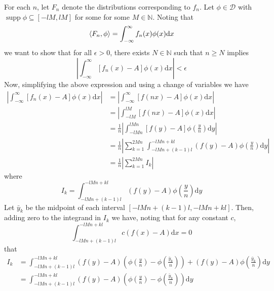 \documentclass{article}
\DeclareMathOperator\supp{supp}
\begin{document}
For each $n$, let $F_n$ denote the distributions corresponding to $f_n$.
Let $\phi \in \mathcal{D}$ with $\supp \phi \subseteq [-l M, l M]$ for
some for some $M \in \mathbb{N}$. Noting that
%
\begin{equation*}
    \langle F_n, \phi \rangle
        = \int_{-\infty}^{\infty} f_n(x) \phi(x) \mathrm{d} x \\
\end{equation*}
%
we want to show that for all $\epsilon > 0$, there exists
$N \in \mathbb{N}$ such that $n \geq N$ implies
%
\begin{equation*}
    \left| \int_{-\infty}^{\infty} \left[ f_n(x) - A \right] \phi(x) \mathrm{d} x \right| < \epsilon
\end{equation*}
%
Now, simplifying the above expression and using a change of variables we have
%
\begin{align*}
    \left| \int_{-\infty}^{\infty} \left[ f_n(x) - A \right] \phi(x) \mathrm{d} x \right|
        &=\left| \int_{-\infty}^{\infty} \left[ f(n x) - A \right] \phi(x) \mathrm{d} x \right| \\
        &= \left| \int_{-l M}^{l M} \left[ f(n x) - A \right] \phi(x) \mathrm{d} x \right| \\
        &= \frac{1}{n} \left| \int_{-l M n}^{l M n} \left[ f(y) - A \right] \phi\left(\frac{y}{n}\right) \mathrm{d} y \right| \\
        &= \frac{1}{n} \left| \sum_{k = 1}^{2 M n} \int_{-l M n + (k - 1) l}^{- l M n + k l} \left( f(y) - A \right) \phi\left(\frac{y}{n}\right) \mathrm{d} y \right| \\
        &= \frac{1}{n} \left| \sum_{k = 1}^{2 M n} I_k \right|
\end{align*}
%
where
%
\begin{equation*}
    I_k = \int_{-l M n + (k - 1) l}^{- l M n + k l} \left( f(y) - A \right) \phi\left(\frac{y}{n}\right) \mathrm{d} y
\end{equation*}
%
Let $\bar{y}_k$ be the midpoint of each interval
$[- l M n + (k - 1) l, - l M n + k l]$. Then, adding zero to the
integrand in $I_k$ we have, noting that for any constant $c$,
%
\begin{equation*}
    \int_{-l M n + (k - 1) l}^{- l M n + k l} c \left( f(x) - A \right) \mathrm{d} x = 0
\end{equation*}
%
that
%
\begin{align*}
    I_k &= \int_{-l M n + (k - 1) l}^{- l M n + k l}
            \left( f(y) - A \right) \left( \phi\left(\frac{y}{n}\right) - \phi\left(\frac{\bar{y}_k}{n}\right) \right)
            + \left( f(y) - A \right) \phi\left(\frac{\bar{y}_k}{n}\right)
           \mathrm{d} y \\
        &= \int_{-l M n + (k - 1) l}^{- l M n + k l}
            \left( f(y) - A \right) \left( \phi\left(\frac{y}{n}\right) - \phi\left(\frac{\bar{y}_k}{n}\right) \right)
           \mathrm{d} y
\end{align*}
\end{document}
